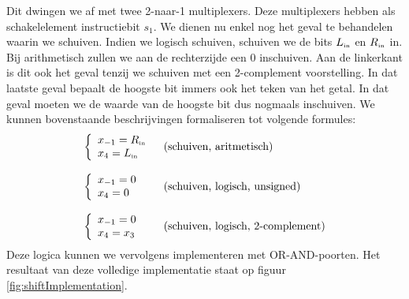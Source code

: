 Dit dwingen we af met twee 2-naar-1 multiplexers. Deze multiplexers hebben als schakelelement instructiebit $s_1$. We dienen nu enkel nog het geval te behandelen waarin we schuiven. Indien we logisch schuiven, schuiven we de bits $L_{\mbox{\tiny{in}}}$ en $R_{\mbox{\tiny{in}}}$ in. Bij arithmetisch zullen we aan de rechterzijde een 0 inschuiven. Aan de linkerkant is dit ook het geval tenzij we schuiven met een 2-complement voorstelling. In dat laatste geval bepaalt de hoogste bit immers ook het teken van het getal. In dat geval moeten we de waarde van de hoogste bit dus nogmaals inschuiven. We kunnen bovenstaande beschrijvingen formaliseren tot volgende formules:
\begin{equation}
\begin{array}{ll}
\left\{\begin{array}{l}
x_{-1}=R_{\mbox{\tiny{in}}}\\
x_4=L_{\mbox{\tiny{in}}}
\end{array}\right.&\mbox{(schuiven, aritmetisch)}\\\\\left\{\begin{array}{l}
x_{-1}=0\\
x_4=0
\end{array}\right.&\mbox{(schuiven, logisch, unsigned)}\\\\\left\{\begin{array}{l}
x_{-1}=0\\
x_4=x_3
\end{array}\right.&\mbox{(schuiven, logisch, 2-complement)}
\end{array}
\end{equation}
Deze logica kunnen we vervolgens implementeren met OR-AND-poorten. Het resultaat van deze volledige implementatie staat op figuur \ref{fig:shiftImplementation}.
